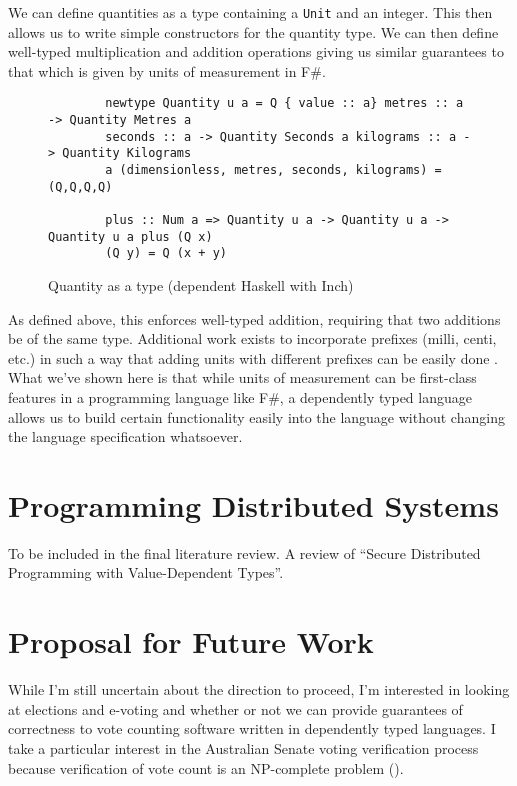 We can define quantities as a type containing a \texttt{Unit} and an integer.
 This then allows us to write simple constructors for the quantity type. We can
 then define well-typed multiplication and addition operations giving us similar
 guarantees to that which is given by units of measurement in F\#. 

\begin{figure}[h]
    \caption{Quantity as a type (dependent Haskell with Inch) \cite{gundry2013}}
    \begin{lstlisting}
        newtype Quantity u a = Q { value :: a} metres :: a -> Quantity Metres a
        seconds :: a -> Quantity Seconds a kilograms :: a -> Quantity Kilograms
        a (dimensionless, metres, seconds, kilograms) = (Q,Q,Q,Q)

        plus :: Num a => Quantity u a -> Quantity u a -> Quantity u a plus (Q x)
        (Q y) = Q (x + y)
    \end{lstlisting}
\end{figure}

As defined above, this enforces well-typed addition, requiring that two
additions be of the same type. Additional work exists to incorporate prefixes
(milli, centi, etc.) in such a way that adding units with different prefixes can
be easily done \cite{gundry2013}. What we've shown here is that while units of
measurement can be first-class features in a programming language like F\#, a
dependently typed language allows us to build certain functionality easily into
the language without changing the language specification whatsoever. 

\section{Programming Distributed Systems}

To be included in the final literature review. A review of ``Secure Distributed
Programming with Value-Dependent Types''. \cite{fstar_distributed_programming}

\section{Proposal for Future Work}

While I'm still uncertain about the direction to proceed, I'm interested in
looking at elections and e-voting and whether or not we can provide guarantees
of correctness to vote counting software written in dependently typed languages.
I take a particular interest in the Australian Senate voting verification
process because verification of vote count is an NP-complete problem
(\cite{aus_senate}). 

